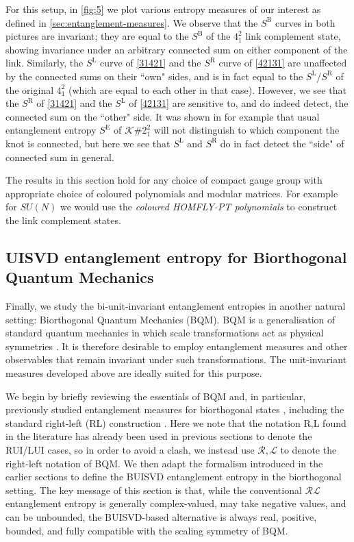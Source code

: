 \documentclass[11pt,a4paper]{article}
\begin{document}
For this setup, in \cref{fig:5} we plot various entropy measures of our interest as defined in \cref{sec:entanglement-measures}. We observe that the $S^\mathrm{B}$ curves in both pictures are invariant; they are equal to the $S^\mathrm{B}$ of the $4^2_1$ link complement state, showing invariance under an arbitrary connected sum on either component of the link. Similarly, the $S^\mathrm{L}$ curve of \cref{31421} and the $S^\mathrm{R}$ curve of \cref{42131} are unaffected by the connected sums on their ``own" sides, and is in fact equal to the $S^\mathrm{L}$/$S^\mathrm{R}$ of the original $4^2_1$ (which are equal to each other in that case). However, we see that the $S^\mathrm{R}$ of \cref{31421} and the $S^\mathrm{L}$ of \cref{42131} are sensitive to, and do indeed detect, the connected sum on the ``other" side. It was shown in \cite{Balasubramanian_2017} for example that usual entanglement entropy $S^\mathrm{E}$ of $\mathcal{K}\#2^2_1$ will not distinguish to which component the knot is connected, but here we see that $S^\mathrm{L}$ and $S^\mathrm{R}$ do in fact detect the ``side" of connected sum in general.

The results in this section hold for any choice of compact gauge group with appropriate choice of coloured polynomials and modular matrices. For example for $SU(N)$ we would use the \textit{coloured HOMFLY-PT polynomials} to construct the link complement states. 
\subsection{UISVD entanglement entropy for Biorthogonal Quantum Mechanics} \label{sec-BQM}
Finally, we study the bi-unit-invariant entanglement entropies in another natural setting: Biorthogonal Quantum Mechanics (BQM). BQM is a generalisation of standard quantum mechanics in which scale transformations act as physical symmetries \cite{Brody:BQM2014}. It is therefore desirable to employ entanglement measures and other observables that remain invariant under such transformations. The unit-invariant measures developed above are ideally suited for this purpose.

We begin by briefly reviewing the essentials of BQM and, in particular, previously studied entanglement measures for biorthogonal states \cite{Brody:BQM2014}, including the standard right-left (RL) construction \cite{Chang:2019nhn,Yang:2024hzt,Herviou:2019yfb}. Here we note that the notation R,L found in the literature has already been used in previous sections to denote the RUI/LUI cases, so in order to avoid a clash, we instead use $\mathcal{R},\mathcal{L}$ to denote the right-left notation of BQM. We then adapt the formalism introduced in the earlier sections to define the BUISVD entanglement entropy in the biorthogonal setting. The key message of this section is that, while the conventional $\mathcal{RL}$ entanglement entropy is generally complex-valued, may take negative values, and can be unbounded, the BUISVD-based alternative is always real, positive, bounded, and fully compatible with the scaling symmetry of BQM. 
\end{document}
